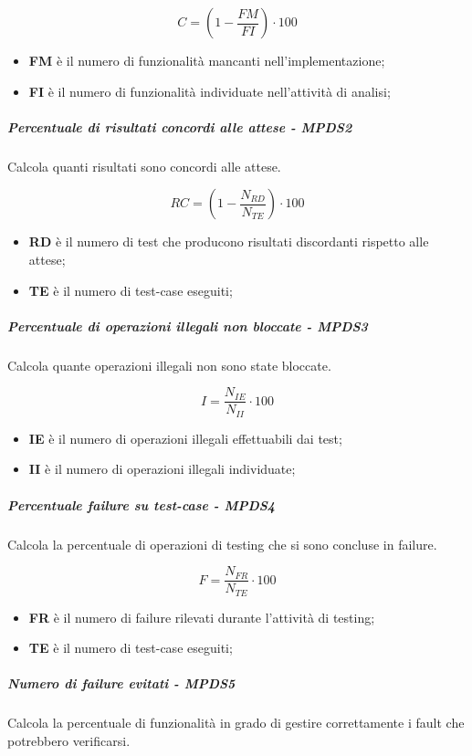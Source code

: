 \begin{equation*}
C=(1-\frac{FM}{FI})\cdot 100
\end{equation*}
\begin{itemize}
	\item \textbf{FM} è il numero di funzionalità mancanti nell'implementazione;
	\item \textbf{FI} è il numero di funzionalità individuate nell'attività di analisi;
\end{itemize}
\subparagraph{Percentuale di risultati concordi alle attese - MPDS2}
Calcola quanti risultati sono concordi alle attese.

\begin{equation*} RC = (1-\frac{N_{RD}}{N_{TE}}) \cdot 100 \end{equation*}
\begin{itemize}
	\item \textbf{RD} è il numero di test che producono risultati discordanti rispetto alle attese;
	\item \textbf{TE}  è il numero di test-case eseguiti;
\end{itemize}
\subparagraph{Percentuale di operazioni illegali non bloccate - MPDS3}
Calcola quante operazioni illegali non sono state bloccate.

\begin{equation*}I=\frac{N_{IE}}{N_{II}} \cdot 100\end{equation*}
\begin{itemize}
	\item \textbf{IE} è il numero di operazioni illegali effettuabili dai test;
	\item \textbf{II} è il numero di operazioni illegali individuate;
\end{itemize}
\subparagraph{Percentuale failure su test-case - MPDS4}
Calcola la percentuale di operazioni di testing che si sono concluse in failure.

\begin{equation*}F=\frac{N_{FR}}{N_{TE}} \cdot 100 \end{equation*}
\begin{itemize}
	\item \textbf{FR} è il numero di failure rilevati durante l'attività di testing;
	\item \textbf{TE} è il numero di test-case eseguiti;
\end{itemize}
\subparagraph{Numero di failure evitati - MPDS5}
Calcola la percentuale di funzionalità in grado di gestire correttamente i fault che potrebbero verificarsi.

